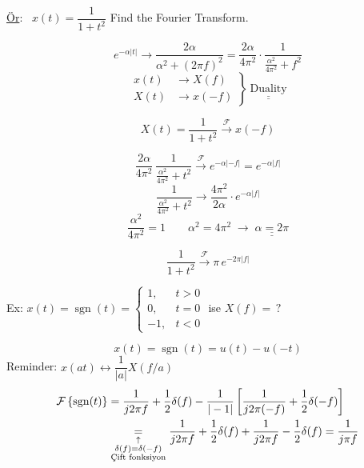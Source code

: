 \documentclass[11pt,a4paper]{article}
\begin{document}
\begin{ornek}
\underline{Ör}: \ $x(t)=\dfrac{1}{1+t^2}$ \qquad Find the Fourier Transform.
\end{ornek}
\[ e^{-\alpha|t|} \longrightarrow \frac{2\alpha}{\alpha^2+(2\pi f)^2}=\frac{2\alpha}{4\pi^2}\cdot\frac{1}{\frac{\alpha^2}{4\pi^2}+f^2} \]
\[ \left.\begin{aligned} x(t)&\longrightarrow X(f)\\ X(t)&\longrightarrow x(-f)\end{aligned}\right\}\ \underline{\underline{\text{Duality}}} \]
\noindent
\begin{minipage}[t]{0.42\linewidth}
\[ X(t)=\frac{1}{1+t^2} \xrightarrow{\ \mathcal{F}\ } x(-f) \]
\end{minipage}\hfill
\begin{minipage}[t]{0.56\linewidth}
\[ \frac{2\alpha}{4\pi^2}\,\frac{1}{\frac{\alpha^2}{4\pi^2}+t^2} \xrightarrow{\ \mathcal{F}\ } e^{-\alpha|-f|}=e^{-\alpha|f|} \]
\[ \frac{1}{\frac{\alpha^2}{4\pi^2}+t^2} \longrightarrow \frac{4\pi^2}{2\alpha}\cdot e^{-\alpha|f|} \]
\[ \frac{\alpha^2}{4\pi^2}=1 \qquad \alpha^2=4\pi^2 \;\longrightarrow\; \underline{\underline{\alpha=2\pi}} \]
\end{minipage}
\[ \frac{1}{1+t^2} \xrightarrow{\ \mathcal{F}\ } \pi\,e^{-2\pi|f|} \]

\begin{ornek}
Ex: \quad $x(t)=\operatorname{sgn}(t)=\begin{cases} 1, & t>0\\ 0, & t=0\\ -1, & t<0\end{cases}$ \quad ise $X(f)=\,?$
\begin{center}
\end{center}
\end{ornek}
\[ x(t)=\operatorname{sgn}(t)=u(t)-u(-t) \]
Reminder: \quad $x(at) \longleftrightarrow \dfrac{1}{|a|}X(f/a)$
\begin{align*}
\mathcal{F}\left\{\operatorname{sgn}(t)\right\} &= \frac{1}{j2\pi f}+\frac{1}{2}\delta(f)-\frac{1}{|-1|}\left[\frac{1}{j2\pi(-f)}+\frac{1}{2}\delta(-f)\right]\\
&\underset{\substack{\uparrow\\ \delta(f)=\delta(-f)\\ \text{Çift fonksiyon}}}{=}\frac{1}{j2\pi f}+\frac{1}{2}\delta(f)+\frac{1}{j2\pi f}-\frac{1}{2}\delta(f)=\frac{1}{j\pi f}
\end{align*}
\end{document}
